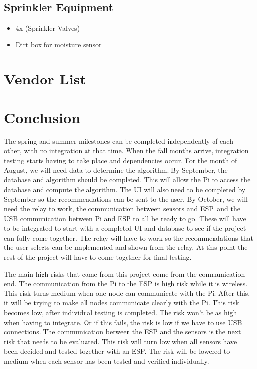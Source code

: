 \documentclass[letterpaper, 10 pt, conference]{ieeeconf}  %
\begin{document}
\subsection{Sprinkler Equipment}
\begin{itemize}
  \item 4x (Sprinkler Valves)
  \item Dirt box for moisture sensor
\end{itemize}

\section{Vendor List}

\section{Conclusion}
The spring and summer milestones can be completed independently of each other, with no integration at that time. When the fall months arrive, integration testing starts having to take place and dependencies occur. For the month of August, we will need data to determine the algorithm. By September, the database and algorithm should be completed. This will allow the Pi to access the database and compute the algorithm. The UI will also need to be completed by September so the recommendations can be sent to the user. By October, we will need the relay to work, the communication between sensors and ESP, and the USB communication between Pi and ESP to all be ready to go. These will have to be integrated to start with a completed UI and database to see if the project can fully come together. The relay will have to work so the recommendations that the user selects can be implemented and shown from the relay. At this point the rest of the project will have to come together for final testing. 

The main high risks that come from this project come from the communication end. The communication from the Pi to the ESP is high risk while it is wireless. This risk turns medium when one node can communicate with the Pi. After this, it will be trying to make all nodes communicate clearly with the Pi. This risk becomes low, after individual testing is completed. The risk won't be as high when having to integrate. Or if this fails, the risk is low if we have to use USB connections. The communication between the ESP and the sensors is the next risk that needs to be evaluated. This risk will turn low when all sensors have been decided and tested together with an ESP. The risk will be lowered to medium when each sensor has been tested and verified individually. 
\end{document}

